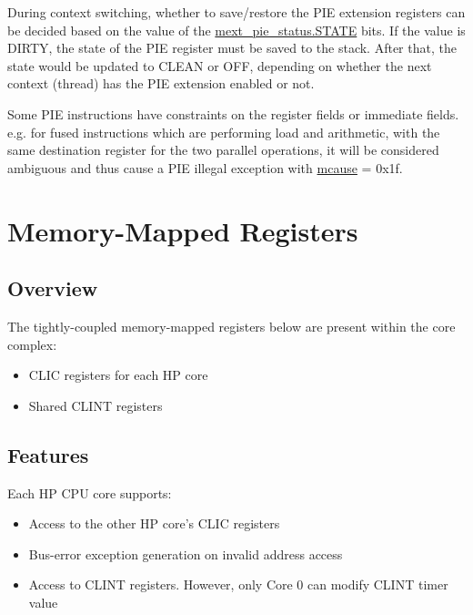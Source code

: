 \documentclass[main\_\_EN.tex]{subfiles}
\begin{document}
During context switching, whether to save/restore the PIE extension registers can be decided based on the value of the \hyperref[fielddesc:MEXT_PIE_STATE]{mext\_pie\_status.STATE} bits. If the value is DIRTY, the state of the PIE register must be saved to the stack. After that, the state would be updated to CLEAN or OFF, depending on whether the next context (thread) has the PIE extension enabled or not.

Some PIE instructions have constraints on the register fields or immediate fields. e.g. for fused instructions which are performing load and arithmetic, with the same destination register for the two parallel operations, it will be considered ambiguous and thus cause a PIE illegal exception with \hyperref[regdesc:MCAUSE]{mcause} = 0x1f.

\newpage
\section{Memory-Mapped Registers}
\label{sec:riscvcpu-tcip}

\subsection{Overview}
\label{sec:riscvcpu-tcip-overview}

The tightly-coupled memory-mapped registers below are present within the core complex:

\begin{itemize}
    \item CLIC registers for each HP core
    \item Shared CLINT registers
\end{itemize}

\subsection{Features}
\label{sec:riscvcpu-tcip-features}

Each HP CPU core supports:
\begin{itemize}
    \item Access to the other HP core's CLIC registers
    \item Bus-error exception generation on invalid address access
    \item Access to CLINT registers. However, only Core 0 can modify CLINT timer value
\end{itemize}
\end{document}
